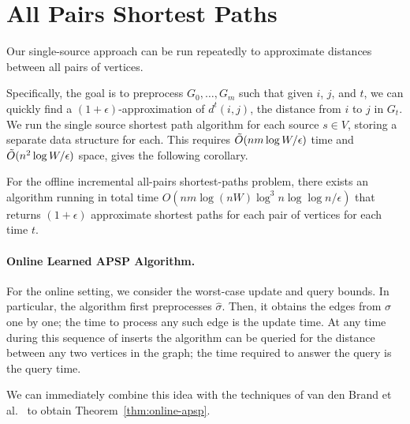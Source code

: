 \section{All Pairs Shortest Paths}

Our single-source  approach can be run repeatedly to approximate distances between all pairs of vertices.

Specifically, the goal is to preprocess $G_0, \ldots, G_m$ such that given $i$, $j$, and $t$, we can quickly find a $(1 + \epsilon)$-approximation of $d^t(i,j)$, the distance from $i$ to $j$ in $G_t$.  
We run the single source shortest path algorithm for each source $s\in V$, storing a separate data structure for each.  
This requires $\Tilde{O}(nm\log W/\epsilon)$ time and $\Tilde{O}(n^2 \log W / \epsilon)$ space, gives the following corollary.


\begin{corollary}
\label{cor:offline-approx-apsp}
    For the offline incremental all-pairs shortest-paths problem, there exists an algorithm running in total time $ O(nm\log(nW)\log^3 n \log\log n/\epsilon)$ that returns $(1+\epsilon)$ approximate shortest paths for each pair of vertices for each time $t$. 
\end{corollary}

\paragraph{Online Learned APSP Algorithm.}  
For the online setting, we consider the worst-case update and query bounds.  In particular, the algorithm first preprocesses $\hat{\sigma}$.  Then, it obtains the edges from $\sigma$ one by one; the time to process any such edge is the update time.  At any time during this sequence of inserts the algorithm can be queried for the distance between any two vertices in the graph; the time required to answer the query is the query time.

We can immediately combine this idea with the techniques of van den Brand et al.~\cite[Theorem 3.1]{BrandFNP24} to obtain Theorem~\ref{thm:online-apsp}.  

